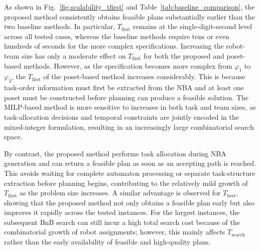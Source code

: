\documentclass[lettersize,journal]{IEEEtran}
\theoremstyle{italiclemma}
\theoremstyle{italiclemma}
\theoremstyle{definition}
\begin{document}
As shown in Fig.~\ref{fig:scalability_tfirst} and Table~\ref{tab:baseline_comparison}, the proposed method consistently obtains feasible plans substantially earlier than the two baseline methods. In particular, $T_{\mathrm{first}}$ remains at the single-digit-second level across all tested cases, whereas the baseline methods require tens or even hundreds of seconds for the more complex specifications. Increasing the robot-team size has only a moderate effect on $T_{\mathrm{first}}$ for both the proposed and poset-based
methods. However, as the specification becomes more complex from $\varphi_1$ to $\varphi_3$, the $T_{\mathrm{first}}$ of the poset-based method increases considerably. This is because task-order information
must first be extracted from the NBA and at least one poset must be constructed before planning can produce a feasible solution. The MILP-based method is more sensitive to increases in both task and team sizes, as task-allocation decisions and temporal constraints are jointly encoded in the mixed-integer formulation, resulting in an increasingly large combinatorial search space.

By contrast, the proposed method performs task allocation during NBA generation and can return a feasible plan as soon as an accepting path is reached. This avoids waiting for complete automaton processing or separate task-structure extraction before planning begins, contributing to the relatively mild growth of
$T_{\mathrm{first}}$ as the problem size increases. A similar advantage is observed for $T_{\mathrm{best}}$, showing that the proposed method not only obtains a feasible plan early but also improves it rapidly
across the tested instances. For the largest instances, the subsequent BnB search can still incur a high total search cost because of the combinatorial growth of robot assignments; however, this mainly affects $T_{\mathrm{search}}$ rather than the early availability of feasible
and high-quality plans.



\end{document}
